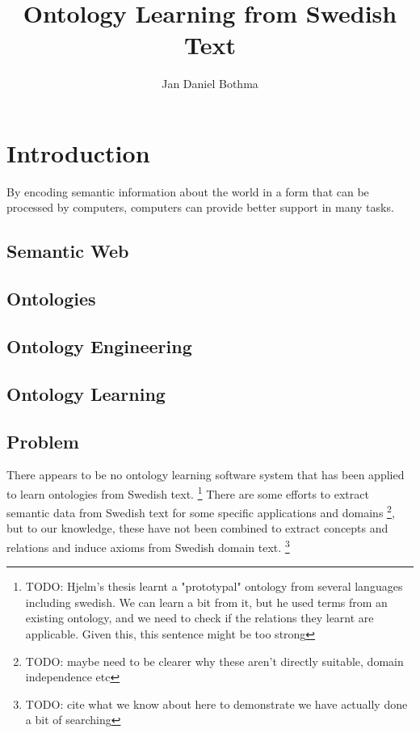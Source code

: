 \documentclass[a4paper]{report}
\title{Ontology Learning from Swedish Text}
\author{Jan Daniel Bothma}
\newcommand{\todo}[1]{\footnote{{\color{red} TODO: #1}}}
\begin{document}
\maketitle

\begin{abstract}
\end{abstract}	

\tableofcontents

\chapter{Introduction}

By encoding semantic information about the world in a form that can be processed by computers, computers can provide better support in many tasks.


\section{Semantic Web}

\section{Ontologies}

\section{Ontology Engineering}

\section{Ontology Learning}


\section{Problem}

There appears to be no ontology learning software system that has been applied to learn ontologies from Swedish text.
\todo{Hjelm's thesis\cite{Hjelm09Thesis} learnt a "prototypal" ontology from several languages including swedish.
We can learn a bit from it, but he used terms from an existing ontology, and we need to check if the relations they learnt are applicable.
Given this, this sentence might be too strong}
There are some efforts to extract semantic data from Swedish text for some specific applications and domains
\todo{maybe need to be clearer why these aren't directly suitable, domain independence etc}, but to our knowledge, these have not been combined to extract concepts and relations and induce axioms from Swedish domain text.
\todo{cite what we know about here to demonstrate we have actually done a bit of searching}
\end{document}
